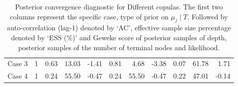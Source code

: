 \documentclass{amsart}
\begin{document}
\begin{table}[ht]
{\begin{tabular}{lc|crr|crr|crr}
			Case 3 & 1 & 0.63 & 13.03 & -1.41 & 0.81 & 4.68 & -3.38 & 0.07 & 61.78 & 1.71 \\ 
			Case 4 & 1 & 0.24 & 55.50 & -0.47 & 0.24 & 55.50 & -0.47 & 0.22 & 47.01 & -0.14 \\ 
			\bottomrule
	\end{tabular}
\caption{Posterior convergence diagnostic for Different copulas. The first two columns represent the specific case, type of prior on $\mu_j\mid T$. Followed by auto-correlation (lag-1) denoted by `AC', effective sample size percentage denoted by `ESS (\%)' and Geweke score of posterior samples of depth, posterior samples of the number of terminal nodes and likelihood.}\label{tab:gauss:convergence}}
\end{table}




\end{document}
